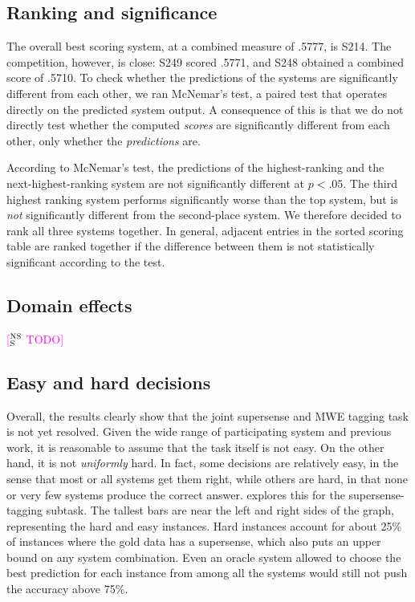 \documentclass[11pt,letterpaper]{article}
\newcommand{\ensuretext}[1]{#1}
\newcommand{\nssmarker}{\ensuretext{\textcolor{magenta}{\ensuremath{^{\textsc{NS}}_{\textsc{S}}}}}}
\newcommand{\arkcomment}[3]{\ensuretext{\textcolor{#3}{[#1 #2]}}}
\newcommand{\nss}[1]{\arkcomment{\nssmarker}{#1}{magenta}}
\begin{document}
\subsection{Ranking and significance}

The overall best scoring system, at a combined measure of .5777, is S214. 
The competition, however, is close: S249 scored .5771, and S248 obtained a combined score of .5710.  
To check whether the predictions of the systems are significantly different from each other, 
we ran McNemar's test, a paired test that operates directly on the predicted system output. 
A consequence of this is that we do not directly test whether the computed \emph{scores} 
are significantly different from each other, only whether the \emph{predictions} are. 

According to McNemar's test, the predictions of the highest-ranking and the next-highest-ranking system 
are not significantly different at $p < .05$. The third highest ranking system performs significantly worse 
than the top system, but is \emph{not} significantly different from the second-place system. 
We therefore decided to rank all three systems together. 
In general, adjacent entries in the sorted scoring table are ranked together 
if the difference between them is not statistically significant according to the test. 

\subsection{Domain effects}

\nss{TODO}

\subsection{Easy and hard decisions}

Overall, the results clearly show that the joint supersense and MWE tagging task is not yet resolved. 
Given the wide range of participating system and previous work, it is reasonable to assume that 
the task itself is not easy. On the other hand, it is not \emph{uniformly} hard. 
In fact, some decisions are relatively easy, in the sense that most or all systems get them right, 
while others are hard, in that none or very few systems produce the correct answer. 
 explores this for the supersense-tagging subtask. 
The tallest bars are near the left and right sides of the graph, representing the hard and easy instances. 
Hard instances account for about 25\% of instances where the gold data has a supersense, 
which also puts an upper bound on any system combination. 
Even an oracle system allowed to choose the best prediction for each instance 
from among all the systems would still not push the accuracy above 75\%.
\end{document}
